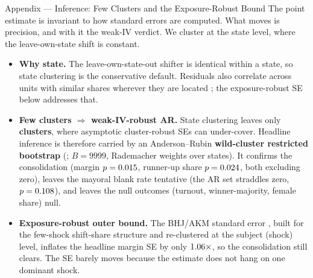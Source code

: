 

\begin{frame}{Appendix --- Inference: Few Clusters and the Exposure-Robust Bound}
\hypertarget{app:inference}{}
\footnotesize
The point estimate is invariant to how standard errors are computed. What moves is precision, and with it the weak-IV verdict. We cluster at the state level, where the leave-own-state shift is constant.
\smallskip
\begin{itemize}\itemsep3pt
  \item \textbf{Why state.} The leave-own-state-out shifter is identical within a state, so state clustering is the conservative default. Residuals also correlate across units with similar shares wherever they are located \citep{adao2019}; the exposure-robust SE below addresses that.
  \item \textbf{Few clusters $\Rightarrow$ weak-IV-robust AR.} State clustering leaves only \textbf{\NClusters{} clusters}, where asymptotic cluster-robust SEs can under-cover. Headline inference is therefore carried by an Anderson--Rubin \textbf{wild-cluster restricted bootstrap} (; $B=9999$, Rademacher weights over \ARNClusters{} states). It confirms the consolidation (margin $p=0.015$, runner-up share $p=0.024$, both excluding zero), leaves the mayoral blank rate tentative (the AR set straddles zero, $p=0.108$), and leaves the null outcomes (turnout, winner-majority, female share) null.
  \item \textbf{Exposure-robust outer bound.} The BHJ/AKM standard error , built for the few-shock shift-share structure and re-clustered at the subject (shock) level, inflates the headline margin SE by only $1.06\times$, so the consolidation still clears. The SE barely moves because the estimate does not hang on one dominant shock. \hfill\hyperlink{app:exposure}{}
\end{itemize}

\centerline{\hyperlink{src:identbrief}{}}
\end{frame}

